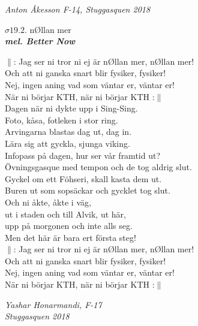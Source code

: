 \documentclass[a6paper,10pt]{article}
\newcommand{\mel}[1]{\small\textbf{\textit{mel. #1 \\}}}
\begin{document}
\begin{flushright}
\textit{Anton Åkesson F-14, Stuggasquen 2018}
\end{flushright}

\setlength{\oddsidemargin}{-0.47in}


\begin{center}
\Large $\sigma19.2$. nØllan mer\\ 
\mel{Better Now}
\end{center}\small$\|$: Jag ser ni tror ni ej är nØllan mer, nØllan mer!\\
Och att ni ganska snart blir fysiker, fysiker!\\
Nej, ingen aning vad som väntar er, väntar er!\\
När ni börjar KTH, när ni börjar KTH :$\|$
\vspace{5pt}\\
Dagen när ni dykte upp i Sing-Sing.\\
Foto, kåsa, fotleken i stor ring.\\
Arvingarna blastas dag ut, dag in.\\
Lära sig att gyckla, sjunga viking.
\vspace{5pt}\\
Infopass på dagen, hur ser vår framtid ut?\\
Övningsgasque med tempon och de tog aldrig slut.\\
Gyckel om ett Föhseri, skall kasta dem ut.\\
Buren ut som sopsäckar och gycklet tog slut.
\vspace{5pt}\\
Och ni åkte, åkte i väg,\\
ut i staden och till Alvik, ut här,\\
upp på morgonen och inte alls seg.\\
Men det här är bara ert första steg!
\vspace{5pt}\\
$\|$: Jag ser ni tror ni ej är nØllan mer, nØllan mer!\\
Och att ni ganska snart blir fysiker, fysiker!\\
Nej, ingen aning vad som väntar er, väntar er!\\
När ni börjar KTH, när ni börjar KTH :$\|$
\begin{flushright}
\textit{Yashar Honarmandi, F-17\\ Stuggasquen 2018}
\end{flushright}
\end{document}
